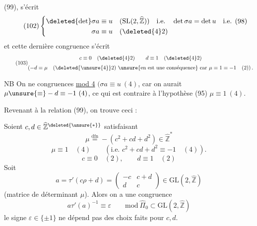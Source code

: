 
  (99),
 s'écrit
\[
\tag{102}
\left\{\begin{aligned}
\deleted{\det}\sigma a&\equiv u\quad
(\mathrm{SL}(2,\widehat{\mathbb Z}))\quad\text{i.e.}\quad
\det\sigma a=\det u\quad\text{i.e. (98)}\\
\sigma a&\equiv u\quad(\deleted{4}2)
\end{aligned}\right.
\]
 et cette dernière congruence s'écrit
\[
\tag{103}\begin{gathered}
c\equiv0\quad(\deleted{4}2)\qquad d\equiv1\quad(\deleted{4}2)
\\[3pt]
\left(-d\equiv\mu\quad(\deleted{\unsure{4}}2)\ \text{\unsure{en est une conséquence}}
\ \text{car }\mu\equiv1\equiv-1\quad(2)\right).
\end{gathered}\]

NB On ne  
congruences \uline{mod 4}
$(\sigma a\equiv u\ (4)$, car on aurait
$\mu\unsure{\equiv}-d\equiv-1\ (4)$, ce qui est contraire à l'hypothèse
(95) $\mu\equiv1\ (4)$.


Revenant à la relation (99), on trouve ceci :

  Soient
$c,d\in\widehat{\mathbb Z}^{\deleted{\unsure{*}}}$ satisfaisant
\[
\tag{104}
\mu\overset{\mathrm{dfn}}{=}-(c^2+cd+d^2)\in\widehat{\mathbb Z}^{*}
\]
\[
\tag{105}
\mu\equiv1\quad(4)\qquad
(\text{i.e. }c^2+cd+d^2\equiv-1\quad(4)).
\]
\[
\tag{106}
c\equiv0\quad(2),\qquad d\equiv1\quad(2)
\]
Soit  
\[
\tag{107}
a=\tau'(c\rho+d)=
\begin{pmatrix}-c&c+d\\d&c\end{pmatrix}
\in\mathrm{GL}(2,\widehat{\mathbb Z})
\]
(matrice de déterminant $\mu$). Alors on a une congruence
\[
\tag{108}
a\tau'(a)^{-1}\equiv\varepsilon\qquad
\mathrm{mod}\ \widehat{\Pi}_0\subset\mathrm{GL}(2,\widehat{\mathbb Z})
\]
 le signe $\varepsilon\in\{\pm1\}$ ne dépend pas des
choix faits pour $c,d$.

